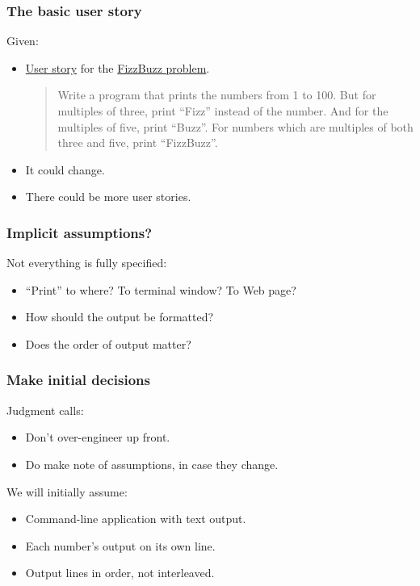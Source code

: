 \begin{frame}
  \frametitle{The basic user story}

  Given:
  \begin{itemize}
  \item \href{http://martinfowler.com/bliki/UserStory.html}{User story} for the \href{http://c2.com/cgi/wiki?FizzBuzzTest}{FizzBuzz problem}.

  \begin{quotation}
Write a program that prints the numbers from 1 to 100. But for multiples of three, print ``Fizz'' instead of the number. And for the multiples of five, print ``Buzz''. For numbers which are multiples of both three and five, print ``FizzBuzz''.
  \end{quotation}

  \item It could change.
  \item There could be more user stories.
  \end{itemize}

\end{frame}

\begin{frame}
  \frametitle{Implicit assumptions?}

  Not everything is fully specified:
  \begin{itemize}
  \item ``Print'' to where? To terminal window? To Web page?
  \item How should the output be formatted?
  \item Does the order of output matter?
  \end{itemize}
\end{frame}

\begin{frame}
  \frametitle{Make initial decisions}

  Judgment calls:  
  \begin{itemize}
  \item Don't over-engineer up front.
  \item Do make note of assumptions, in case they change.
  \end{itemize}

  We will initially assume:
  \begin{itemize}
  \item Command-line application with text output.
  \item Each number's output on its own line.
  \item Output lines in order, not interleaved.
  \end{itemize}
\end{frame}

